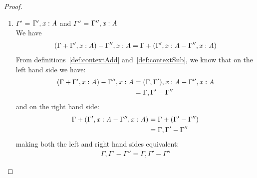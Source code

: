 \begin{proof}
\begin{enumerate}
    \item $\Gamma'$ = $\Gamma'  ,   \mathit{x}  :  \mathit{A}$ and $\Gamma''$ = $\Gamma''  ,   \mathit{x}  :  \mathit{A}$\\
      We have
      \begin{align*}
        (\Gamma + \Gamma'  ,   \mathit{x}  :  \mathit{A}) - \Gamma''  ,   \mathit{x}  :  \mathit{A} = \Gamma + (\Gamma'  ,   \mathit{x}  :  \mathit{A} -
        \Gamma''  ,   \mathit{x}  :  \mathit{A})
      \end{align*}
      From definitions~\ref{def:contextAdd} and~\ref{def:contextSub}, we know that
      on the left hand side we have:
      \begin{align*}
        (\Gamma + \Gamma'  ,   \mathit{x}  :  \mathit{A}) - \Gamma''  ,   \mathit{x}  :  \mathit{A} &= (\Gamma,\Gamma'), \mathit{x}  :  \mathit{A} -
                                                   \Gamma''  ,   \mathit{x}  :  \mathit{A} \\
                                                 &= \Gamma, \Gamma' - \Gamma''
      \end{align*}
      and on the right hand side:
      \begin{align*}
        \Gamma + (\Gamma'  ,   \mathit{x}  :  \mathit{A} - \Gamma''  ,   \mathit{x}  :  \mathit{A}) &= \Gamma + (\Gamma' - \Gamma'') \\
                                                &= \Gamma, \Gamma' - \Gamma''
      \end{align*}
      making both the left and right hand sides equivalent:
      \begin{align*}
        \Gamma, \Gamma' - \Gamma'' = \Gamma, \Gamma' - \Gamma''
      \end{align*}


\end{enumerate}
\end{proof}
